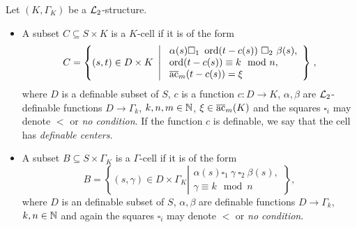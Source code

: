 \begin{defn}[Cells]\label{def:cell} Let $(K,\Gamma_K)$ be a ${\mathcal L}_2$-structure.  
\begin{itemize}[leftmargin=*]
\item A subset $C\subseteq S\times K$ is a $K$-cell if it is of the form 
\[C = \left\{(s,t) \in D\times K \ \left| \ \begin{array}{l} \alpha(s) \square_1 \ \operatorname{ord}(t-c(s)) \ \square_2 \ \beta(s),\\ \operatorname{ord}(t-c(s)) \equiv k\mod n,\\ {\overline{\rm ac}}_{m}(t-c(s)) = \xi \end{array} \right\}\right.,\]
where $D$ is a definable subset of $S$, $c$ is a function $c:D\to K$, $\alpha, \beta$ are $\mathcal{L}_2$-definable functions $D\to\Gamma_k$, $k, n, m \in {\mathbb N}$, $\xi \in {\overline{\rm ac}}_{m}(K)$ and the squares $\square_i$ may denote $<$ or \emph{no condition}. If the function $c$ is definable, we say that the cell has \emph{definable centers}.  
\item A subset $B\subseteq S\times \Gamma_K$ is a $\Gamma$-cell if it is of the form
\[B= \left\{(s,\gamma)\in D\times \Gamma_K \left|\begin{array}{l} \alpha(s) \square_1 \ \gamma \ \square_2 \ \beta(s), \\
\gamma \equiv k\mod n \end{array}\right\}\right.,\]
where $D$ is an definable subset of $S$, $\alpha, \beta$ are definable functions $D\to\Gamma_k$, $k, n\in {\mathbb N}$ and again the squares $\square_i$ may denote $<$ or \emph{no condition}.  
\end{itemize}
\end{defn}

